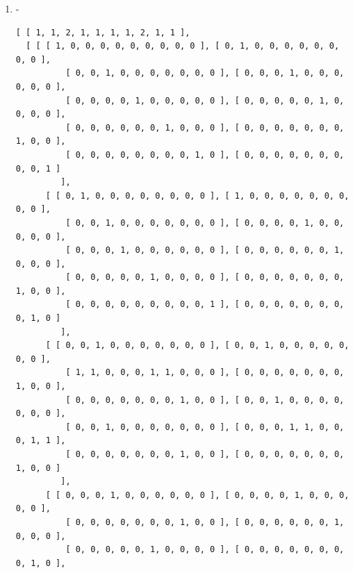 \documentclass[a4paper, 10pt]{book}
\theoremstyle{definition}
\numberwithin{equation}{chapter}
\begin{document}
\begin{appendices}
\begin{enumerate}
\begin{lstlisting}[numbers=none]
          [ 1, 0, 0, 0, 0, 0, 0, 0, 0, 0 ], [ 0, 1, 0, 0, 0, 0, 0, 0, 0, 0 ],
          [ 0, 0, 1, 0, 0, 0, 0, 0, 0, 0 ], [ 0, 0, 0, 1, 0, 0, 0, 0, 0, 0 ] 
         ], 
      [ [ 0, 0, 0, 0, 0, 0, 0, 0, 1, 0 ], [ 0, 0, 0, 0, 0, 0, 0, 0, 0, 1 ], 
          [ 0, 0, 0, 0, 0, 0, 0, 1, 0, 0 ], [ 0, 0, 0, 0, 0, 0, 1, 0, 0, 0 ],
          [ 0, 0, 0, 0, 0, 1, 0, 0, 0, 0 ], [ 0, 0, 0, 0, 1, 0, 0, 0, 0, 0 ],
          [ 0, 0, 1, 0, 0, 0, 0, 0, 0, 0 ], [ 0, 0, 0, 1, 0, 0, 0, 0, 0, 0 ],
          [ 0, 1, 0, 0, 0, 0, 0, 0, 0, 0 ], [ 1, 0, 0, 0, 0, 0, 0, 0, 0, 0 ] 
         ], 
      [ [ 0, 0, 0, 0, 0, 0, 0, 0, 0, 1 ], [ 0, 0, 0, 0, 0, 0, 0, 0, 1, 0 ], 
          [ 0, 0, 0, 0, 0, 0, 1, 0, 0, 0 ], [ 0, 0, 0, 0, 0, 0, 0, 1, 0, 0 ],
          [ 0, 0, 0, 0, 0, 1, 0, 0, 0, 0 ], [ 0, 0, 0, 0, 1, 0, 0, 0, 0, 0 ],
          [ 0, 0, 0, 1, 0, 0, 0, 0, 0, 0 ], [ 0, 0, 1, 0, 0, 0, 0, 0, 0, 0 ],
          [ 1, 0, 0, 0, 0, 0, 0, 0, 0, 0 ], [ 0, 1, 0, 0, 0, 0, 0, 0, 0, 0 ] 
         ] ] ]
	\end{lstlisting}
	\item -\begin{lstlisting}[numbers=none]
	[ [ 1, 1, 2, 1, 1, 1, 1, 2, 1, 1 ], 
  [ [ [ 1, 0, 0, 0, 0, 0, 0, 0, 0, 0 ], [ 0, 1, 0, 0, 0, 0, 0, 0, 0, 0 ], 
          [ 0, 0, 1, 0, 0, 0, 0, 0, 0, 0 ], [ 0, 0, 0, 1, 0, 0, 0, 0, 0, 0 ],
          [ 0, 0, 0, 0, 1, 0, 0, 0, 0, 0 ], [ 0, 0, 0, 0, 0, 1, 0, 0, 0, 0 ],
          [ 0, 0, 0, 0, 0, 0, 1, 0, 0, 0 ], [ 0, 0, 0, 0, 0, 0, 0, 1, 0, 0 ],
          [ 0, 0, 0, 0, 0, 0, 0, 0, 1, 0 ], [ 0, 0, 0, 0, 0, 0, 0, 0, 0, 1 ] 
         ], 
      [ [ 0, 1, 0, 0, 0, 0, 0, 0, 0, 0 ], [ 1, 0, 0, 0, 0, 0, 0, 0, 0, 0 ], 
          [ 0, 0, 1, 0, 0, 0, 0, 0, 0, 0 ], [ 0, 0, 0, 0, 1, 0, 0, 0, 0, 0 ],
          [ 0, 0, 0, 1, 0, 0, 0, 0, 0, 0 ], [ 0, 0, 0, 0, 0, 0, 1, 0, 0, 0 ],
          [ 0, 0, 0, 0, 0, 1, 0, 0, 0, 0 ], [ 0, 0, 0, 0, 0, 0, 0, 1, 0, 0 ],
          [ 0, 0, 0, 0, 0, 0, 0, 0, 0, 1 ], [ 0, 0, 0, 0, 0, 0, 0, 0, 1, 0 ] 
         ], 
      [ [ 0, 0, 1, 0, 0, 0, 0, 0, 0, 0 ], [ 0, 0, 1, 0, 0, 0, 0, 0, 0, 0 ], 
          [ 1, 1, 0, 0, 0, 1, 1, 0, 0, 0 ], [ 0, 0, 0, 0, 0, 0, 0, 1, 0, 0 ],
          [ 0, 0, 0, 0, 0, 0, 0, 1, 0, 0 ], [ 0, 0, 1, 0, 0, 0, 0, 0, 0, 0 ],
          [ 0, 0, 1, 0, 0, 0, 0, 0, 0, 0 ], [ 0, 0, 0, 1, 1, 0, 0, 0, 1, 1 ],
          [ 0, 0, 0, 0, 0, 0, 0, 1, 0, 0 ], [ 0, 0, 0, 0, 0, 0, 0, 1, 0, 0 ] 
         ], 
      [ [ 0, 0, 0, 1, 0, 0, 0, 0, 0, 0 ], [ 0, 0, 0, 0, 1, 0, 0, 0, 0, 0 ], 
          [ 0, 0, 0, 0, 0, 0, 0, 1, 0, 0 ], [ 0, 0, 0, 0, 0, 0, 1, 0, 0, 0 ],
          [ 0, 0, 0, 0, 0, 1, 0, 0, 0, 0 ], [ 0, 0, 0, 0, 0, 0, 0, 0, 1, 0 ],

\end{lstlisting}
\end{enumerate}
\end{appendices}
\end{document}
